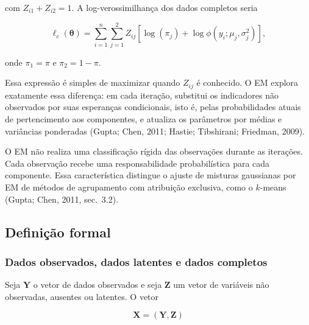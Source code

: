 \documentclass[
  letterpaper,
  DIV=11,
  numbers=noendperiod]{scrreprt}
\begin{document}
com \(Z_{i1}+Z_{i2}=1\). A log-verossimilhança dos dados completos seria

\[\ell_c(\boldsymbol{\theta})
=
\sum_{i=1}^n\sum_{j=1}^2
Z_{ij}
\left[
\log(\pi_j)
+
\log\phi(y_i;\mu_j,\sigma_j^2)
\right],\]

onde \(\pi_1=\pi\) e \(\pi_2=1-\pi\).

Essa expressão é simples de maximizar quando \(Z_{ij}\) é conhecido. O
EM explora exatamente essa diferença: em cada iteração, substitui os
indicadores não observados por suas esperanças condicionais, isto é,
pelas probabilidades atuais de pertencimento aos componentes, e atualiza
os parâmetros por médias e variâncias ponderadas (Gupta; Chen, 2011;
Hastie; Tibshirani; Friedman, 2009).

\begin{tcolorbox}[enhanced jigsaw, colback=white, leftrule=.75mm, colbacktitle=quarto-callout-note-color!10!white, breakable, titlerule=0mm, bottomtitle=1mm, title=\textcolor{quarto-callout-note-color}{\faInfo}\hspace{0.5em}{Interpretação}, colframe=quarto-callout-note-color-frame, toprule=.15mm, opacityback=0, bottomrule=.15mm, opacitybacktitle=0.6, arc=.35mm, toptitle=1mm, rightrule=.15mm, coltitle=black, left=2mm]

O EM não realiza uma classificação rígida das observações durante as
iterações. Cada observação recebe uma responsabilidade probabilística
para cada componente. Essa característica distingue o ajuste de misturas
gaussianas por EM de métodos de agrupamento com atribuição exclusiva,
como o \(k\)-means (Gupta; Chen, 2011, sec.~3.2).

\end{tcolorbox}

\subsection{Definição formal}\label{definiuxe7uxe3o-formal-2}

\subsubsection{Dados observados, dados latentes e dados
completos}\label{dados-observados-dados-latentes-e-dados-completos}

Seja \(\boldsymbol{Y}\) o vetor de dados observados e seja
\(\boldsymbol{Z}\) um vetor de variáveis não observadas, ausentes ou
latentes. O vetor

\[\boldsymbol{X}=(\boldsymbol{Y},\boldsymbol{Z})\]
\end{document}
